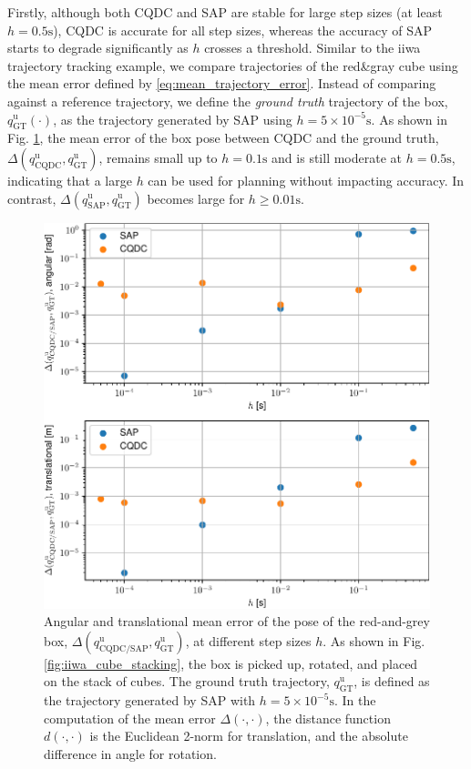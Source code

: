 Firstly, although both CQDC and SAP are stable for large step sizes (at least $h=0.5\mathrm{s}$), CQDC is accurate for all step sizes, whereas the accuracy of SAP starts to degrade significantly as $h$ crosses a threshold. 
Similar to the iiwa trajectory tracking example, we compare trajectories of the red\&gray cube using the mean error defined by \eqref{eq:mean_trajectory_error}. Instead of comparing against a reference trajectory, we define the \emph{ground truth} trajectory of the box, $q_\mathrm{GT}^\mathrm{u}(\cdot)$, as the trajectory generated by SAP using $h=5 \times 10^{-5} \mathrm{s}$.
As shown in Fig. \ref{fig:error_vs_time_step}, the mean error of the box pose between CQDC and the ground truth, $\Delta (q_\mathrm{CQDC}^\mathrm{u}, q_\mathrm{GT}^\mathrm{u})$, remains small up to $h=0.1\mathrm{s}$ and is still moderate at $h=0.5\mathrm{s}$, indicating that a large $h$ can be used for planning without impacting accuracy.
In contrast, $\Delta (q_\mathrm{SAP}^\mathrm{u}, q_\mathrm{GT}^\mathrm{u})$ becomes large for $h \geq 0.01 \mathrm{s}$.
\begin{figure}
\centering
\includegraphics[width=0.8\linewidth]{figures/02_quasi_static_dynamics/error_vs_time_step.pdf}
\caption{Angular and translational mean error of the pose of the red-and-grey box, $\Delta (q_\mathrm{CQDC/SAP}^\mathrm{u}, q_\mathrm{GT}^\mathrm{u})$, at different step sizes $h$.
As shown in Fig. \ref{fig:iiwa_cube_stacking}, the box is picked up, rotated, and placed on the stack of cubes.
The ground truth trajectory, $q_\mathrm{GT}^\mathrm{u}$, is defined as the trajectory generated by SAP with $h=5\times10^{-5}\mathrm{s}$.
In the computation of the mean error $\Delta(\cdot, \cdot)$, the distance function $d(\cdot, \cdot)$ is the Euclidean 2-norm for translation, and the absolute difference in angle for rotation.
}
\label{fig:error_vs_time_step}
\end{figure}

